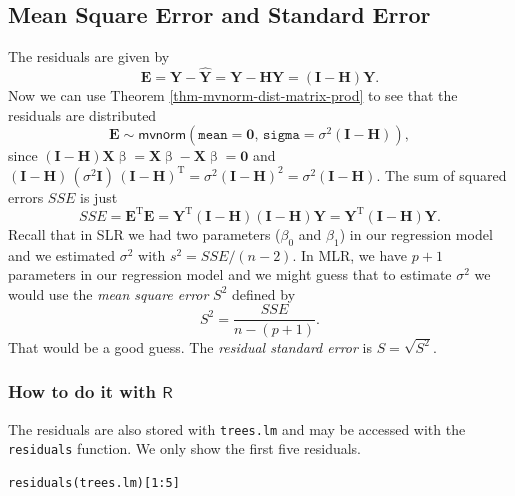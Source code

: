 \documentclass[captions=tableheading]{scrbook}
\begin{document}
\subsection{Mean Square Error and Standard Error}
\label{sec-12-2-3}
\label{sub-mlr-mse-se}


The residuals are given by
\begin{equation}
\mathbf{E}=\mathbf{Y}-\hat{\mathbf{Y}}=\mathbf{Y}-\mathbf{H}\mathbf{Y}=(\mathbf{I}-\mathbf{H})\mathbf{Y}.
\end{equation}
Now we can use Theorem \ref{thm-mvnorm-dist-matrix-prod} to see that the residuals are distributed
\begin{equation}
\mathbf{E}\sim\mathsf{mvnorm}(\mathtt{mean}=\mathbf{0},\,\mathtt{sigma}=\sigma^{2}(\mathbf{I}-\mathbf{H})),
\end{equation}
since \((\mathbf{I}-\mathbf{H})\mathbf{X}\upbeta=\mathbf{X}\upbeta-\mathbf{X}\upbeta=\mathbf{0}\) and \((\mathbf{I}-\mathbf{H})\,(\sigma^{2}\mathbf{I})\,(\mathbf{I}-\mathbf{H})^{\mathrm{T}}=\sigma^{2}(\mathbf{I}-\mathbf{H})^{2}=\sigma^{2}(\mathbf{I}-\mathbf{H})\). The sum of squared errors \(SSE\) is just
\begin{equation}
SSE=\mathbf{E}^{\mathrm{T}}\mathbf{E}=\mathbf{Y}^{\mathrm{T}}(\mathbf{I}-\mathbf{H})(\mathbf{I}-\mathbf{H})\mathbf{Y}=\mathbf{Y}^{\mathrm{T}}(\mathbf{I}-\mathbf{H})\mathbf{Y}.
\end{equation}
Recall that in SLR we had two parameters (\(\beta_{0}\) and \(\beta_{1}\)) in our regression model and we estimated \(\sigma^{2}\) with \(s^{2}=SSE/(n-2)\). In MLR, we have \(p+1\) parameters in our regression model and we might guess that to estimate \(\sigma^{2}\) we would use the \emph{mean square error} \(S^{2}\) defined by 
\begin{equation}
S^{2}=\frac{SSE}{n-(p+1)}.
\end{equation}
That would be a good guess. The \emph{residual standard error} is \(S=\sqrt{S^{2}}\).
\subsubsection{How to do it with \(\mathsf{R}\)}
\label{sec-12-2-3-1}


The residuals are also stored with \texttt{trees.lm} and may be accessed with the \texttt{residuals} function. We only show the first five residuals.


\begin{verbatim}
residuals(trees.lm)[1:5]
\end{verbatim}
\end{document}
